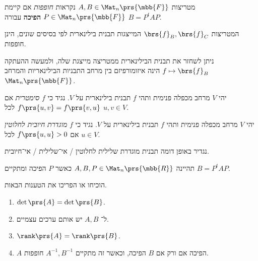 \documentclass[a4paper,10pt,twoside,openany]{book}
\begin{document}
\begin{definition}
מטריצות
$A,B \in \Mat_n\prs{\mbb{F}}$
נקראות
\emph{חופפות}
אם קיימת
$P \in \Mat_n\prs{\mbb{F}}$
\textbf{הפיכה}
עבורה
$B = P^t A P$.
\end{definition}

\begin{corollary}
המטריצות
$\brs{f}_B, \brs{f}_C$
המייצגות תבנית בילינארית לפי בסיסים שונים, הינן חופפות.
\end{corollary}

\begin{remark}
ניתן לשחזר את תבנית הבילינארית ממטריצה מייצגת שלה, ולמעשה ההעתקה
$f \mapsto \brs{f}_B$
הינה איזומורפיזם בין מרחב התבניות הבילינאריות והמרחב
$\Mat_n\prs{\mbb{F}}$.
\end{remark}

\begin{definition}
יהי
$V$
מרחב מכפלה פנימית ותהי
$f$
תבנית בילינארית על
$V$.
נגיד כי
$f$
\emph{סימטרית}
אם
$f\prs{u,v} = f\prs{v,u}$
לכל
$u,v \in V$.
\end{definition}

\begin{definition}
יהי
$V$
מרחב מכפלה פנימית ותהי
$f$
תבנית בילינארית על
$V$.
נגיד כי
$f$
\emph{מוגדרת חיובית לחלוטין}
אם
$f\prs{u,u} > 0$
לכל
$u \in V$.

נגדיר באופן דומה תבנית מוגדרת שלילית לחלוטין%
\slash%
אי־שלילית%
\slash%
אי־חיובית.
\end{definition}

\begin{exercisechap}
תהיינה
$A,B,P \in \Mat_n\prs{\mbb{R}}$
כאשר
$P$
הפיכה ומתקיים
$B = P^t A P$.

הוכיחו או הפריכו את הטענות הבאות.
\begin{enumerate}
\item $\det\prs{A} = \det\prs{B}$.
\item ל־%
$A,B$
יש אותם ערכים עצמיים.
\item $\rank\prs{A} = \rank\prs{B}$.
\item $A$
הפיכה אם ורק אם
$B$
הפיכה, וכאשר זה מתקיים
$A^{-1}, B^{-1}$
חופפות.
\end{enumerate}
\end{exercisechap}
\end{document}
